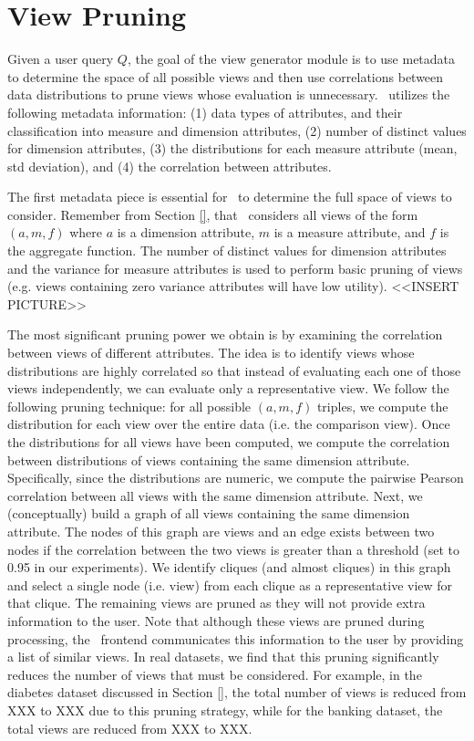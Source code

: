 
\section{View Pruning}
\label{subsec:pruning}

Given a user query $Q$, the goal of the view generator module is to use metadata
to determine the space of all possible views and then use correlations between
data distributions to prune views whose evaluation is unnecessary. \SeeDB\
utilizes the following metadata information: (1) data types of attributes, and
their classification into measure and dimension attributes, (2) number of
distinct values for dimension attributes, (3) the
distributions for each measure attribute (mean, std deviation), and (4) the
correlation between attributes.

The first metadata piece is essential for \SeeDB\ to determine the full space of
views to consider. 
Remember from Section \ref{}, that \SeeDB\ considers all
views of the form $(a, m, f)$ where $a$ is a dimension attribute, $m$ is a
measure attribute, and $f$ is the aggregate function. 
The number of distinct values for dimension attributes and the variance for
measure attributes is used to perform basic pruning of views (e.g. views
containing zero variance attributes will have low utility).
<<INSERT PICTURE>>

The most significant pruning power we obtain is by examining the correlation
between views of different attributes.
The idea is to identify views whose distributions are highly correlated so that
instead of evaluating each one of those views independently, we can evaluate
only a representative view. 
We follow the following pruning technique: for all possible $(a, m, f)$ triples,
we compute the distribution for each view over the entire data (i.e.
the comparison view). 
Once the distributions for all views have been computed, we compute the
correlation between distributions of views containing the same dimension
attribute. 
Specifically, since the distributions are numeric, we compute the pairwise
Pearson correlation between all views with the same dimension attribute.
Next, we (conceptually) build a graph of all views containing the
same dimension attribute. 
The nodes of this graph are views and an edge exists between two nodes if the
correlation between the two views is greater than a threshold (set to 0.95 in
our experiments). 
We identify cliques (and almost cliques) in this graph and select a single node
(i.e. view) from each clique as a representative view for that clique. 
The
remaining views are pruned as they will not provide extra information to the
user. 
Note that although these views are pruned during processing, the \SeeDB\
frontend communicates this information to the user by providing a list of similar views.
In real datasets, we find that this pruning significantly reduces the
number of views that must be considered.
For example, in the diabetes dataset discussed in Section \ref{}, the total
number of views is reduced from XXX to XXX due to this pruning strategy, while
for the banking dataset, the total views are reduced from XXX to XXX.

